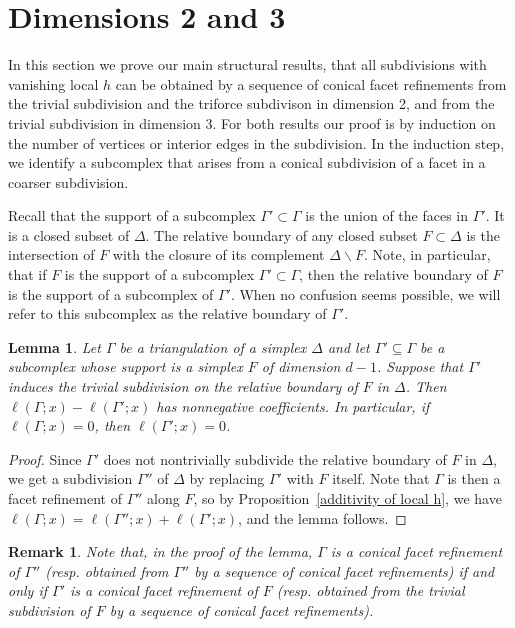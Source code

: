 \documentclass[10pt]{amsart}
\newtheorem{lemma}[theorem]{Lemma}
\newtheorem{rema}[theorem]{Remark}
\begin{document}
\section{Dimensions 2 and 3} \label{sec:dim23}

In this section we prove our main structural results, that all subdivisions with vanishing local $h$ can be obtained by a sequence of conical facet refinements from the trivial subdivision and the triforce subdivison in dimension 2, and from the trivial subdivision in dimension 3. For both results our proof is by induction on the number of vertices or interior edges in the subdivision. In the induction step, we identify a subcomplex that arises from a conical subdivision of a facet in a coarser subdivision.


Recall that the support of a subcomplex $\Gamma' \subset \Gamma$ is the union of the faces in $\Gamma'$. It is a closed subset of $\Delta$.
The relative boundary of any closed subset $F \subset \Delta$ is the intersection of $F$ with the closure of its complement $\Delta \smallsetminus F$. Note, in particular, that if $F$ is the support of a subcomplex $\Gamma' \subset \Gamma$, then the relative boundary of $F$ is the support of a subcomplex of $\Gamma'$. When no confusion seems possible, we will refer to this subcomplex as the relative boundary of $\Gamma'$.

\begin{lemma}\label{coarsening-condition}
Let $\Gamma$ be a triangulation of a simplex $\Delta$ and let $\Gamma'\subseteq \Gamma$ be a subcomplex whose support is a simplex $F$ of dimension $d-1$. Suppose that $\Gamma'$ induces the trivial subdivision on the relative boundary of $F$ in $\Delta$.
Then $\ell(\Gamma; x) - \ell(\Gamma'; x)$ has nonnegative coefficients. 
In particular, if $\ell(\Gamma;x)=0$, then $\ell(\Gamma';x)=0$. 
\end{lemma}

\begin{proof}
Since $\Gamma'$ does not nontrivially subdivide the relative boundary of $F$ in $\Delta$, we get a subdivision $\Gamma''$ of $\Delta$ by replacing $\Gamma'$ with $F$ itself. Note that $\Gamma$ is then a facet refinement of $\Gamma''$ along $F$, so by Proposition~\ref{additivity of local h},
we have $\ell(\Gamma;x)=\ell(\Gamma'';x)+\ell(\Gamma';x)$, and the lemma follows.
\end{proof}

\begin{rema}
Note that, in the proof of the lemma, $\Gamma$ is a conical facet refinement of $\Gamma''$ (resp. obtained from $\Gamma''$ by a sequence of conical facet refinements) if and only if $\Gamma'$ is a conical facet refinement of $F$ (resp. obtained from the trivial subdivision of $F$ by a sequence of conical facet refinements).
\end{rema}
\end{document}
